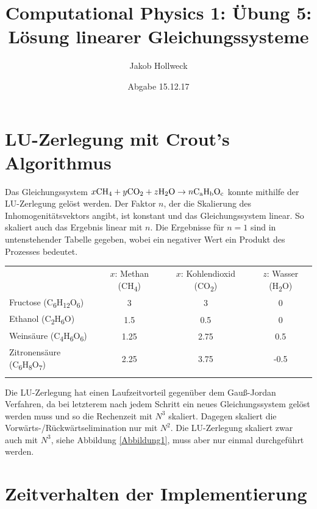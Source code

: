 \documentclass[a4paper, 10pt,onecolumn]{scrartcl}
\title{Computational Physics 1: Übung 5: Lösung linearer Gleichungssysteme}
\author{Jakob Hollweck} %
\date{Abgabe 15.12.17}
\begin{document}
\maketitle


\section*{LU-Zerlegung mit Crout's Algorithmus}

Das Gleichungssystem $x \text{CH\textsubscript{4}} + y \text{CO\textsubscript{2}} + z \text{H\textsubscript{2}O} \rightarrow n \text{C\textsubscript{a}H\textsubscript{b}O\textsubscript{c}}$
konnte mithilfe der LU-Zerlegung gelöst werden. Der Faktor $n$, der die Skalierung des Inhomogenitätsvektors angibt, ist konstant und das Gleichungssystem linear. So skaliert auch das Ergebnis linear mit $n$. Die Ergebnisse für $n=1$ sind in untenstehender Tabelle gegeben, wobei ein negativer Wert ein Produkt des Prozesses bedeutet. 

\begin{center}
	\begin{tabular}{lccc}
		\toprule
		& $x$: Methan (CH\textsubscript{4}) & $x$: Kohlendioxid (CO\textsubscript{2}) & $z$: Wasser (H\textsubscript{2}O) \\
		Fructose (C\textsubscript{6}H\textsubscript{12}O\textsubscript{6}) & 3 & 3 & 0 \\
		Ethanol (C\textsubscript{2}H\textsubscript{6}O) & 1.5 & 0.5 & 0 \\ 
		Weinsäure (C\textsubscript{4}H\textsubscript{6}O\textsubscript{6}) & 1.25 & 2.75 & 0.5 \\
		Zitronensäure (C\textsubscript{6}H\textsubscript{8}O\textsubscript{7}) & 2.25 & 3.75 & -0.5 \\
		\bottomrule
		\label{Tabelle1}
	\end{tabular}
\end{center}

Die LU-Zerlegung hat einen Laufzeitvorteil gegenüber dem Gauß-Jordan Verfahren, da bei letzterem nach jedem Schritt ein neues Gleichungssystem gelöst werden muss und so die Rechenzeit mit $N^3$ skaliert. Dagegen skaliert die Vorwärts-/Rückwärtselimination nur mit $N^2$. Die LU-Zerlegung skaliert zwar auch mit $N^3$, siehe Abbildung \ref{Abbildung1}, muss aber nur einmal durchgeführt werden. 

\newpage

\section*{Zeitverhalten der Implementierung}
\end{document}
